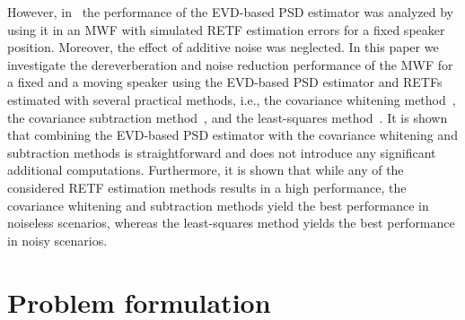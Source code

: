\documentclass{article}
\begin{document}
However, in~\cite{Kodrasi_ICASSP_2017} the performance of the EVD-based PSD estimator was analyzed by using it in an MWF with simulated RETF estimation errors for a fixed speaker position.
Moreover, the effect of additive noise was neglected.
In this paper we investigate the dereverberation and noise reduction performance of the MWF for a fixed and a moving speaker using the EVD-based PSD estimator and RETFs estimated with several practical methods, i.e., the covariance whitening method~\cite{Golan_ITASLP_2009,Golan_ICASSP_2015}, the covariance subtraction method~\cite{Cohen_ITSAP_2004,Golan_ICASSP_2015}, and the least-squares method~\cite{OSchwartz_ITASLP_2015}.
It is shown that combining the EVD-based PSD estimator with the covariance whitening and subtraction methods is straightforward and does not introduce any significant additional computations.
Furthermore, it is shown that while any of the considered RETF estimation methods results in a high performance, the covariance whitening and subtraction methods yield the best performance in noiseless scenarios, whereas the least-squares method yields the best performance in noisy scenarios.






\section{Problem formulation}
\label{sec: conf}
\end{document}
